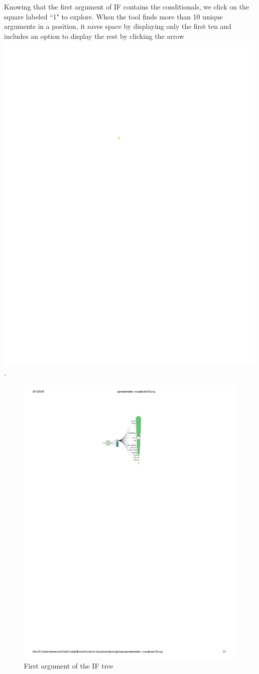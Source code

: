 \documentclass[conference]{IEEEtran}
\begin{document}
	Knowing that the first argument of IF contains the conditionals, we click on
	the square labeled ``1" to explore. When the tool finds more than 10 unique
	arguments in a position, it saves space by displaying only the first ten and
	includes an option to display the rest by clicking the arrow
	\includegraphics{glossary-arrow}.
	
	\begin{figure}[h] \centering \includegraphics[width=0.7\columnwidth]{IFexpand}
		\caption{First argument of the IF tree} \label{fig:expandif} \end{figure}
	
\end{document}
